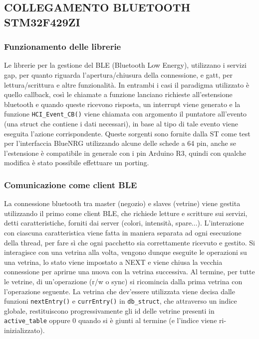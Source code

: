 \subsection{COLLEGAMENTO BLUETOOTH STM32F429ZI}

\subsubsection{Funzionamento delle librerie}

Le librerie per la gestione del BLE (Bluetooth Low Energy), utilizzano i servizi gap, per quanto riguarda l'apertura/chiusura della connessione, e gatt, per lettura/scrittura e altre funzionalit\`a. In entrambi i casi il paradigma utilizzato \`e quello callback, cos\`i le chiamate a funzione lanciano richieste all'estensione bluetooth e quando queste ricevono risposta, un interrupt viene generato e la funzione \texttt{HCI\_Event\_CB()} viene chiamata con argomento il puntatore all'evento (una struct che contiene i dati necessari), in base al tipo di tale evento viene eseguita l'azione corrispondente. 
Queste sorgenti sono fornite dalla ST come test per l'interfaccia BlueNRG utilizzando alcune delle schede a 64 pin, anche se l'estensione \`e compatibile in generale con i pin Arduino R3, quindi con qualche modifica \`e stato possibile effettuare un porting. 

\subsubsection{Comunicazione come client BLE}


La connessione bluetooth tra master (negozio) e slaves (vetrine) viene gestita utilizzando il primo come client BLE, che richiede letture e scritture sui servizi, detti caratteristiche, forniti dai server (colori, intensit\`a, spare...). L'interazione con ciascuna caratteristica viene fatta in maniera separata ad ogni esecuzione della thread, per fare s\`i che ogni pacchetto sia correttamente ricevuto e gestito. Si interagisce con una vetrina alla volta, vengono dunque eseguite le operazioni su una vetrina, lo stato viene impostato a NEXT e viene chiusa la vecchia connessione per aprirne una nuova con la vetrina successiva. Al termine, per tutte le vetrine, di un'operazione (r/w o sync) si ricomincia dalla prima vetrina con l'operazione seguente. La vetrina che dev'essere utilizzata viene decisa dalle funzioni \texttt{nextEntry()} e \texttt{currEntry()} in \texttt{db\_struct}, che attraverso un indice globale, restituiscono progressivamente gli id delle vetrine presenti in \texttt{active\_table} oppure 0 quando si \`e giunti al termine (e l'indice viene ri-inizializzato). 

